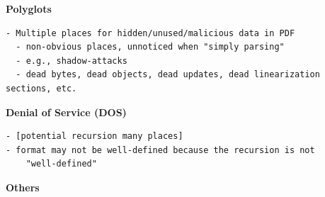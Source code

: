 {\bf{Polyglots}} 
\begin{lstlisting}[style=meta]
- Multiple places for hidden/unused/malicious data in PDF
  - non-obvious places, unnoticed when "simply parsing"
  - e.g., shadow-attacks
  - dead bytes, dead objects, dead updates, dead linearization sections, etc.
\end{lstlisting}

{\bf{Denial of Service (DOS)}} 
%
\begin{lstlisting}[style=meta]
- [potential recursion many places]
- format may not be well-defined because the recursion is not
    "well-defined"
\end{lstlisting}


{\bf{Others}} 
